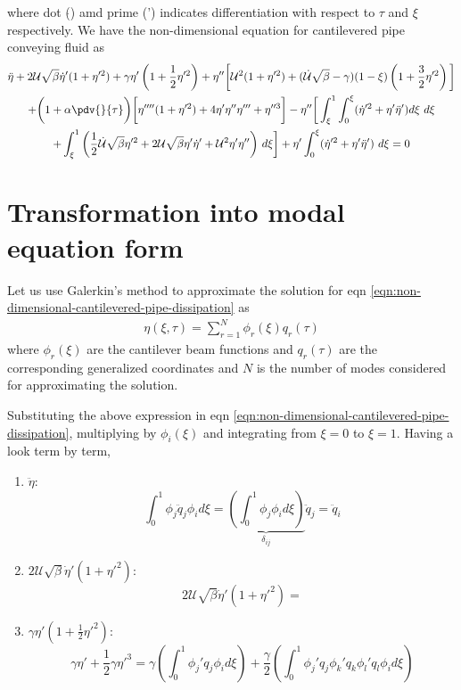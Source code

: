 where  dot ($\dot{}$) amd prime (') indicates differentiation with respect to $\tau$ and $\xi$ respectively.
We have the non-dimensional equation for cantilevered pipe conveying fluid as
\begin{multline}
 \ddot{\eta} + 2\mathcal{U}\sqrt{\beta}\dot{\eta}'(1 + \eta'^2) + \gamma \eta'\left(1 + \frac{1}{2}\eta'^2\right) + \eta''\bigg[\mathcal{U}^2(1 + \eta'^2) + (\dot{\mathcal{U}}\sqrt{\beta} - \gamma)(1 - \xi)\left(1 + \frac{3}{2}\eta'^2\right)\bigg] \\ + \bigg(1 + \alpha\pdv{}{\tau}\bigg) \bigg[\eta''''(1 + \eta'^2) + 4\eta'\eta''\eta''' + \eta''^3\bigg] 
- \eta'' \bigg[\int_\xi^1 \int_0^\xi (\dot{\eta}'^2 + \eta'\ddot{\eta}')d\xi~d\xi \\ + \int_\xi^1 \bigg(\frac{1}{2}\dot{\mathcal{U}}\sqrt{\beta}\eta'^2 + 2\mathcal{U}\sqrt{\beta}\eta'\dot{\eta}' + \mathcal{U}^2\eta'\eta''\bigg)~d\xi\bigg]
+ \eta'\int_0^\xi (\dot{\eta}'^2 +\eta'\ddot{\eta}')~d\xi = 0 \label{eqn:non-dimensional-cantilevered-pipe-dissipation}
\end{multline} 

\section{Transformation into modal equation form}
Let us use Galerkin's method to approximate the solution for eqn \ref{eqn:non-dimensional-cantilevered-pipe-dissipation} as
\begin{align*}
   \eta(\xi, \tau) = \sum_{r=1}^N \phi_r (\xi) q_r (\tau) 
\end{align*}
where $\phi_r (\xi)$ are the cantilever beam functions and $q_r (\tau)$ are the corresponding generalized coordinates and $N$ is the number of modes considered for approximating the solution.

Substituting the above expression in eqn \ref{eqn:non-dimensional-cantilevered-pipe-dissipation}, multiplying by $\phi_i (\xi)$ and integrating from $\xi = 0$ to $\xi = 1$. Having a look term by term,

\begin{enumerate}
	\item $\ddot{\eta}$:
	      $$\int_0^1 \phi_j \ddot{q}_j \phi_i d\xi =  \underbrace{\left(\int_0^1 \phi_j\phi_i d\xi\right)}_{\delta_{ij}} \ddot{q}_j = \ddot{q}_i  $$
    
    \item $2\mathcal{U}\sqrt{\beta}\dot{\eta}'(1 + \eta'^2)$:
          $$2\mathcal{U}\sqrt{\beta}\dot{\eta}'(1 + \eta'^2) =  $$
          
    \item $\gamma \eta'\left(1 + \frac{1}{2}\eta'^2\right)$:
          $$\gamma \eta' + \frac{1}{2}\gamma \eta'^3 = \gamma \left(\int_0^1 \phi_j' q_j \phi_i d\xi\right) + \frac{\gamma}{2} \left(\int_0^1 \phi_j'q_j \phi_k' q_k \phi_l' q_l \phi_i d\xi\right)$$	
\end{enumerate}




